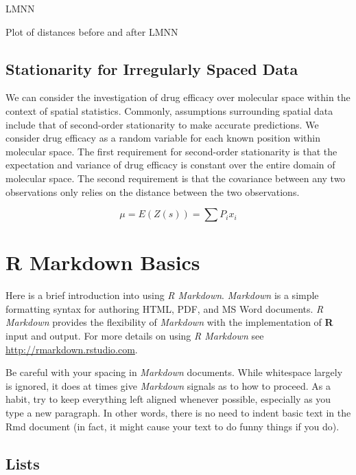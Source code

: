 \documentclass[print]{nuthesis}
\begin{document}
LMNN

Plot of distances before and after LMNN

\hypertarget{stationarity-for-irregularly-spaced-data}{%
\section{Stationarity for Irregularly Spaced Data}\label{stationarity-for-irregularly-spaced-data}}

We can consider the investigation of drug efficacy over molecular space within the context of spatial statistics. Commonly, assumptions surrounding spatial data include that of second-order stationarity to make accurate predictions. We consider drug efficacy as a random variable for each known position within molecular space. The first requirement for second-order stationarity is that the expectation and variance of drug efficacy is constant over the entire domain of molecular space. The second requirement is that the covariance between any two observations only relies on the distance between the two observations.

\begin{equation}
  \mu=E(Z(s))=\sum P_{i}x_{i} 
\end{equation}

\hypertarget{rmd-basics}{%
\chapter{R Markdown Basics}\label{rmd-basics}}

Here is a brief introduction into using \emph{R Markdown}. \emph{Markdown} is a simple formatting syntax for authoring HTML, PDF, and MS Word documents. \emph{R Markdown} provides the flexibility of \emph{Markdown} with the implementation of \textbf{R} input and output. For more details on using \emph{R Markdown} see \url{http://rmarkdown.rstudio.com}.

Be careful with your spacing in \emph{Markdown} documents. While whitespace largely is ignored, it does at times give \emph{Markdown} signals as to how to proceed. As a habit, try to keep everything left aligned whenever possible, especially as you type a new paragraph. In other words, there is no need to indent basic text in the Rmd document (in fact, it might cause your text to do funny things if you do).

\hypertarget{lists}{%
\section{Lists}\label{lists}}
\end{document}
